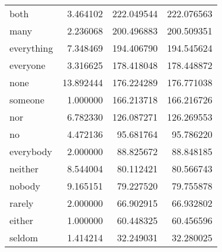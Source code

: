 \begin{table}[ht]
\begin{tabular}{lrrr}
both & {\cellcolor[HTML]{E8F6B1}} \color[HTML]{000000} 3.464102 & {\cellcolor[HTML]{87D0BA}} \color[HTML]{000000} 222.049544 & {\cellcolor[HTML]{87D0BA}} \color[HTML]{000000} 222.076563 \\
many & {\cellcolor[HTML]{F5FBC2}} \color[HTML]{000000} 2.236068 & {\cellcolor[HTML]{9ED9B8}} \color[HTML]{000000} 200.496883 & {\cellcolor[HTML]{9ED9B8}} \color[HTML]{000000} 200.509351 \\
everything & {\cellcolor[HTML]{80CEBB}} \color[HTML]{000000} 7.348469 & {\cellcolor[HTML]{A5DCB7}} \color[HTML]{000000} 194.406790 & {\cellcolor[HTML]{A5DCB7}} \color[HTML]{000000} 194.545624 \\
everyone & {\cellcolor[HTML]{EAF7B1}} \color[HTML]{000000} 3.316625 & {\cellcolor[HTML]{B7E3B6}} \color[HTML]{000000} 178.418048 & {\cellcolor[HTML]{B7E3B6}} \color[HTML]{000000} 178.448872 \\
none & {\cellcolor[HTML]{225CA7}} \color[HTML]{F1F1F1} 13.892444 & {\cellcolor[HTML]{B9E4B5}} \color[HTML]{000000} 176.224289 & {\cellcolor[HTML]{B9E4B5}} \color[HTML]{000000} 176.771038 \\
someone & {\cellcolor[HTML]{FFFFD9}} \color[HTML]{000000} 1.000000 & {\cellcolor[HTML]{C4E8B4}} \color[HTML]{000000} 166.213718 & {\cellcolor[HTML]{C4E8B4}} \color[HTML]{000000} 166.216726 \\
nor & {\cellcolor[HTML]{95D5B9}} \color[HTML]{000000} 6.782330 & {\cellcolor[HTML]{DDF2B2}} \color[HTML]{000000} 126.087271 & {\cellcolor[HTML]{DDF2B2}} \color[HTML]{000000} 126.269553 \\
no & {\cellcolor[HTML]{D5EFB3}} \color[HTML]{000000} 4.472136 & {\cellcolor[HTML]{EEF8B3}} \color[HTML]{000000} 95.681764 & {\cellcolor[HTML]{EDF8B2}} \color[HTML]{000000} 95.786220 \\
everybody & {\cellcolor[HTML]{F7FCC6}} \color[HTML]{000000} 2.000000 & {\cellcolor[HTML]{F0F9B7}} \color[HTML]{000000} 88.825672 & {\cellcolor[HTML]{F0F9B7}} \color[HTML]{000000} 88.848185 \\
neither & {\cellcolor[HTML]{5DC0C0}} \color[HTML]{000000} 8.544004 & {\cellcolor[HTML]{F2FABC}} \color[HTML]{000000} 80.112421 & {\cellcolor[HTML]{F2FABC}} \color[HTML]{000000} 80.566743 \\
nobody & {\cellcolor[HTML]{4CBAC2}} \color[HTML]{F1F1F1} 9.165151 & {\cellcolor[HTML]{F3FABD}} \color[HTML]{000000} 79.227520 & {\cellcolor[HTML]{F2FABC}} \color[HTML]{000000} 79.755878 \\
rarely & {\cellcolor[HTML]{F7FCC6}} \color[HTML]{000000} 2.000000 & {\cellcolor[HTML]{F6FBC5}} \color[HTML]{000000} 66.902915 & {\cellcolor[HTML]{F6FBC5}} \color[HTML]{000000} 66.932802 \\
either & {\cellcolor[HTML]{FFFFD9}} \color[HTML]{000000} 1.000000 & {\cellcolor[HTML]{F8FCC9}} \color[HTML]{000000} 60.448325 & {\cellcolor[HTML]{F8FCC9}} \color[HTML]{000000} 60.456596 \\
seldom & {\cellcolor[HTML]{FCFED1}} \color[HTML]{000000} 1.414214 & {\cellcolor[HTML]{FFFFD9}} \color[HTML]{000000} 32.249031 & {\cellcolor[HTML]{FFFFD9}} \color[HTML]{000000} 32.280025 \\
\bottomrule
\end{tabular}
\end{table}
